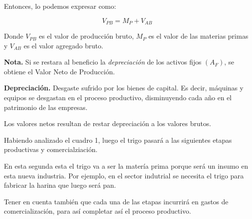 Entonces, lo podemos expresar como:

\begin{equation*}
    V_{PB} = M_P + V_{AB}
\end{equation*}

Donde \(V_{PB}\) es el valor de producción bruto,
\(M_P\) es el valor de las materias primas y
\(V_{AB}\) es el valor agregado bruto.

\textbf{Nota.}
Si se restara al beneficio la \textit{depreciación}
de los activos fijos \((A_F)\),
se obtiene el Valor Neto de Producción.

\textbf{Depreciación.}
Desgaste sufrido por los bienes de capital.
Es decir,
máquinas y equipos se desgastan en el proceso productivo,
disminuyendo cada año en el patrimonio de las empresas.

Los valores netos resultan de restar depreciación a los valores brutos.

Habiendo analizado el cuadro 1,
luego el trigo pasará a las siguientes etapas productivas
y comercialziación.

En esta segunda esta el trigo va a ser la matería prima porque será un insumo
en esta nueva industria.
Por ejemplo, en el sector indutrial se necesita el trigo para fabricar la
harina que luego será pan.

Tener en cuenta también que cada una de las etapas incurrirá en gastos de
comercialización, para así completar así el proceso productivo.

